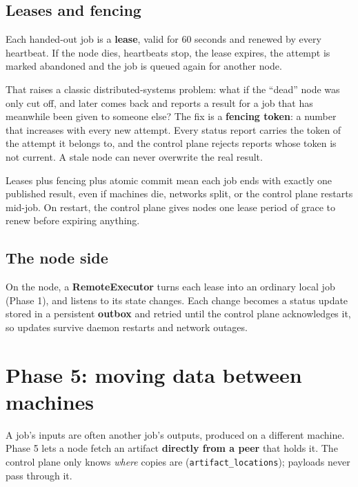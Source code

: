 \documentclass[11pt,a4paper]{report}
\newcommand{\code}[1]{\texttt{#1}}
\begin{document}
\section{Leases and fencing}

Each handed-out job is a \textbf{lease}, valid for 60 seconds and renewed by every heartbeat. If
the node dies, heartbeats stop, the lease expires, the attempt is marked abandoned and the job is
queued again for another node.

That raises a classic distributed-systems problem: what if the ``dead'' node was only cut off,
and later comes back and reports a result for a job that has meanwhile been given to someone else?
The fix is a \textbf{fencing token}: a number that increases with every new attempt. Every status
report carries the token of the attempt it belongs to, and the control plane rejects reports
whose token is not current. A stale node can never overwrite the real result.

\begin{keyidea}
Leases plus fencing plus atomic commit mean each job ends with exactly one published result,
even if machines die, networks split, or the control plane restarts mid-job. On restart, the
control plane gives nodes one lease period of grace to renew before expiring anything.
\end{keyidea}

\section{The node side}

On the node, a \textbf{RemoteExecutor} turns each lease into an ordinary local job (Phase 1), and
listens to its state changes. Each change becomes a status update stored in a persistent
\textbf{outbox} and retried until the control plane acknowledges it, so updates survive daemon
restarts and network outages.

\chapter{Phase 5: moving data between machines}

A job's inputs are often another job's outputs, produced on a different machine. Phase 5 lets a
node fetch an artifact \textbf{directly from a peer} that holds it. The control plane only knows
\emph{where} copies are (\code{artifact\_locations}); payloads never pass through it.
\end{document}
